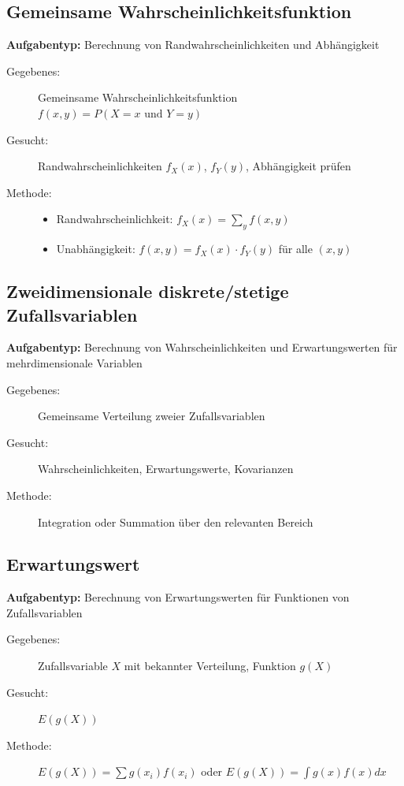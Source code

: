 \documentclass[12pt, a4paper, titlepage, ngerman]{scrartcl}
\begin{document}
\subsection{Gemeinsame Wahrscheinlichkeitsfunktion}

\textbf{Aufgabentyp:} Berechnung von Randwahrscheinlichkeiten und Abhängigkeit

\begin{description}
  \item[Gegebenes:] Gemeinsame Wahrscheinlichkeitsfunktion $f(x,y) = P(X = x \text{ und } Y = y)$
  \item[Gesucht:] Randwahrscheinlichkeiten $f_X(x)$, $f_Y(y)$, Abhängigkeit prüfen
  \item[Methode:] 
    \begin{itemize}
      \item Randwahrscheinlichkeit: $f_X(x) = \sum_y f(x,y)$
      \item Unabhängigkeit: $f(x,y) = f_X(x) \cdot f_Y(y)$ für alle $(x,y)$
    \end{itemize}
\end{description}

\subsection{Zweidimensionale diskrete/stetige Zufallsvariablen}

\textbf{Aufgabentyp:} Berechnung von Wahrscheinlichkeiten und Erwartungswerten für mehrdimensionale Variablen

\begin{description}
  \item[Gegebenes:] Gemeinsame Verteilung zweier Zufallsvariablen
  \item[Gesucht:] Wahrscheinlichkeiten, Erwartungswerte, Kovarianzen
  \item[Methode:] Integration oder Summation über den relevanten Bereich
\end{description}

\subsection{Erwartungswert}

\textbf{Aufgabentyp:} Berechnung von Erwartungswerten für Funktionen von Zufallsvariablen

\begin{description}
  \item[Gegebenes:] Zufallsvariable $X$ mit bekannter Verteilung, Funktion $g(X)$
  \item[Gesucht:] $E(g(X))$
  \item[Methode:] $E(g(X)) = \sum g(x_i) f(x_i)$ oder $E(g(X)) = \int g(x) f(x) dx$
\end{description}
\end{document}
